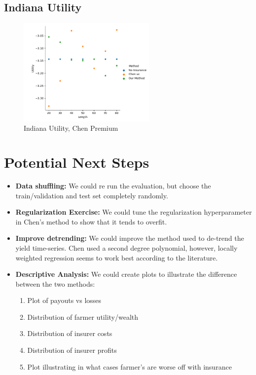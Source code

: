 \documentclass[11pt]{article}
\begin{document}
    \subsection{Indiana Utility}
        \begin{figure}[h]
            \centering
            \includegraphics[width=0.6\textwidth]{../../../output/figures/Chen Premium/Indiana_Utility_Length_ml1241.png}
            \caption{Indiana Utility, Chen Premium}
        \end{figure}
        \FloatBarrier

\section{Potential Next Steps}
\begin{itemize}
  \item \textbf{Data shuffling:} We could re run the evaluation, but choose the train/validation and test set completely randomly. 
  \item \textbf{Regularization Exercise:} We could tune the regularization hyperparameter in Chen's method to show that it tends to overfit. 
  \item \textbf{Improve detrending:} We could improve the method used to de-trend the yield time-series. Chen used a second degree polynomial, however, locally weighted regression seems to work best according to the literature. 
  \item \textbf{Descriptive Analysis:} We could create plots to illustrate the difference between the two methods: 
    \begin{enumerate}
      \item Plot of payouts vs losses
      \item Distribution of farmer utility/wealth
      \item Distribution of insurer costs
      \item Distribution of insurer profits
      \item Plot illustrating in what cases farmer's are worse off with insurance
    \end{enumerate}
\end{itemize}
\end{document}

